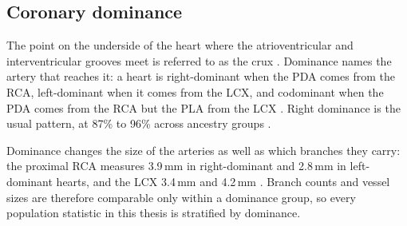 \subsection{Coronary dominance}
\label{sec:dominance}

The point on the underside of the heart where the atrioventricular and interventricular grooves meet is referred to as the crux \cite{allwork1987applied}.
Dominance names the artery that reaches it: a heart is right-dominant when the PDA comes from the RCA, left-dominant when it comes from the LCX, and codominant when the PDA comes from the RCA but the PLA from the LCX \cite{devos2024coronary,allwork1987applied}.
Right dominance is the usual pattern, at 87\% to 96\% across ancestry groups \cite{ihdayhid2021ethnic}.

Dominance changes the size of the arteries as well as which branches they carry: the proximal RCA measures 3.9\,mm in right-dominant and 2.8\,mm in left-dominant hearts, and the LCX 3.4\,mm and 4.2\,mm \cite{dodge1992diameter}.
Branch counts and vessel sizes are therefore comparable only within a dominance group, so every population statistic in this thesis is stratified by dominance.
